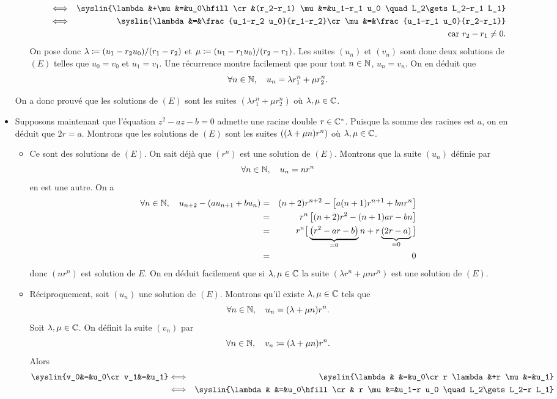 \documentclass{magnolia}
\begin{document}
\begin{preuve}
\begin{itemize}
\begin{itemize}
\begin{eqnarray*}
&\ssi& \syslin{\lambda &+\mu&=&u_0\hfill\cr &(r_2-r_1) \mu&=&u_1-r_1 u_0 \quad L_2\gets L_2-r_1 L_1}\\
&\ssi& \syslin{\lambda&=&\frac{u_1-r_2 u_0}{r_1-r_2}\cr \mu&=&\frac{u_1-r_1 u_0}{r_2-r_1}}\\
&    & \text{car $r_2-r_1\neq 0$.}
\end{eqnarray*}
On pose donc $\lambda\coloneqq (u_1-r_2 u_0)/(r_1-r_2)$ et $\mu\coloneqq(u_1-r_1 u_0)/(r_2-r_1)$. Les suites $(u_n)$ et $(v_n)$ sont donc deux solutions de $(E)$ telles que $u_0=v_0$ et $u_1=v_1$. Une récurrence montre facilement que pour tout $n\in\mathbb{N}$, $u_n=v_n$. On en déduit que
\[\forall n\in\mathbb{N},\quad u_n=\lambda r_1^n+\mu r_2^n.\]
\end{itemize}
On a donc prouvé que les solutions de $(E)$ sont les suites $(\lambda r_1^n+\mu r_2^n)$ où $\lambda,\mu\in\mathbb{C}$.
\item Supposons maintenant que l'équation $z^2-az-b=0$ admette une racine double $r\in\mathbb{C}^*$. Puisque la somme des racines est $a$, on en déduit que $2r=a$. Montrons que les solutions de $(E)$ sont les suites $\left((\lambda+\mu n)r^n\right)$ où $\lambda,\mu\in\mathbb{C}$.
\begin{itemize}
\item Ce sont des solutions de $(E)$. On sait déjà que $(r^n)$ est une solution de $(E)$. Montrons que la suite $(u_n)$ définie par
\[\forall n\in\mathbb{N},\quad u_n=n r^n\]
en est une autre. On a
\begin{eqnarray*}
\forall n\in\mathbb{N},\quad u_{n+2}-\left(au_{n+1}+bu_n\right)
&=& (n+2)r^{n+2}-\left[a(n+1)r^{n+1}+b n r^n\right]\\
&=& r^n\left[(n+2)r^2-(n+1)ar-bn\right]\\
&=& r^n\big[\underbrace{\left(r^2-ar-b\right)}_{=0}n+r\underbrace{(2r-a)}_{=0}\big]\\
&=& 0
\end{eqnarray*}
donc $(n r^n)$ est solution de $E$. On en déduit facilement que si $\lambda,\mu\in\mathbb{C}$ la suite $(\lambda r^n + \mu n r^n)$ est une solution de $(E)$.
\item Réciproquement, soit $(u_n)$ une solution de $(E)$. Montrons qu'il existe $\lambda,\mu\in\mathbb{C}$ tels que
\[\forall n\in\mathbb{N},\quad u_n=(\lambda+\mu n)r^n.\]
Soit $\lambda,\mu\in\mathbb{C}$. On définit la suite $(v_n)$ par
\[\forall n\in\mathbb{N},\quad v_n\coloneqq(\lambda+\mu n)r^n.\]
Alors
\begin{eqnarray*}
\syslin{v_0&=&u_0\cr v_1&=&u_1}
&\ssi& \syslin{\lambda & &=&u_0\cr r \lambda&+r \mu&=&u_1}\\
&\ssi& \syslin{\lambda & &=&u_0\hfill\cr & r \mu&=&u_1-r u_0 \quad L_2\gets L_2-r L_1}\\

\end{eqnarray*}
\end{itemize}
\end{itemize}
\end{preuve}
\end{document}
